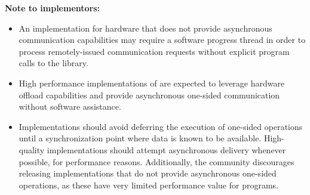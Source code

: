 \textbf{Note to implementors:}
\begin{itemize}
  \item An \openshmem implementation for hardware that does not provide
      asynchronous communication capabilities may require a software progress
      thread in order to process remotely-issued communication requests without
      explicit program calls to the \openshmem library.
  \item High performance implementations of \openshmem are expected to leverage
      hardware offload capabilities and provide asynchronous one-sided
      communication without software assistance.
  \item Implementations should avoid deferring the execution of one-sided
      operations until a synchronization point where data is known to be
      available. High-quality implementations should attempt asynchronous delivery
      whenever possible, for performance reasons. Additionally, the \openshmem
      community discourages releasing \openshmem implementations that do not
      provide asynchronous one-sided operations, as these have very limited
      performance value for \openshmem programs.
\end{itemize}

